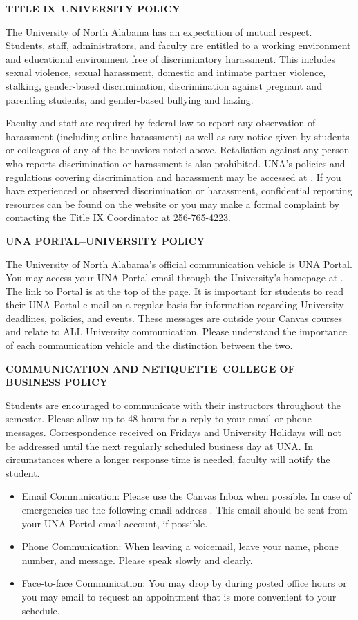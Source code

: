 \documentclass[12pt]{letter}
\newcommand{\customhref}[2]{
	\href{#1}{\color{blue}\burl{#2}}	
}
\begin{document}
\textbf{TITLE IX--UNIVERSITY POLICY} \par
The University of North Alabama has an expectation of mutual respect. Students, staff, administrators, and faculty are entitled to a working environment and educational environment free of discriminatory harassment. This includes sexual violence, sexual harassment, domestic and intimate partner violence, stalking, gender-based discrimination, discrimination against pregnant and parenting students, and gender-based bullying and hazing.

\par Faculty and staff are required by federal law to report any observation of harassment (including online harassment) as well as any notice given by students or colleagues of any of the behaviors noted above. Retaliation against any person who reports discrimination or harassment is also prohibited. UNA's policies and regulations covering discrimination and harassment may be accessed at \customhref{https://www.una.edu/titleix/}{https://www.una.edu/titleix/}. If you have experienced or observed discrimination or harassment, confidential reporting resources can be found on the website or you may make a formal complaint by contacting the Title IX Coordinator at 256-765-4223.

\textbf{UNA PORTAL--UNIVERSITY POLICY} \par
The University of North Alabama's official communication vehicle is UNA Portal. You may access your UNA Portal email through the University's homepage at \customhref{https://www.una.edu/}{https://www.una.edu/}. The link to Portal is at the top of the page. It is important for students to read their UNA Portal e-mail on a regular basis for information regarding University deadlines, policies, and events. These messages are outside your Canvas courses and relate to ALL University communication. Please understand the importance of each communication vehicle and the distinction between the two.

\textbf{COMMUNICATION AND NETIQUETTE--COLLEGE OF BUSINESS POLICY} \par
Students are encouraged to communicate with their instructors throughout the semester. Please allow up to 48 hours for a reply to your email or phone messages. Correspondence received on Fridays and University Holidays will not be addressed until the next regularly scheduled business day at UNA. In circumstances where a longer response time is needed, faculty will notify the student.
\begin{itemize}
	\item Email Communication: Please use the Canvas Inbox when possible. In case of emergencies use the following email address \customhref{mailto:\instremail}{\instremail}. This email should be sent from your UNA Portal email account, if possible.
	\item Phone Communication: When leaving a voicemail, leave your name, phone number, and message. Please speak slowly and clearly.
	\item Face-to-face Communication: You may drop by during posted office hours or you may email to request an appointment that is more convenient to your schedule.
\end{itemize}
\end{document}
